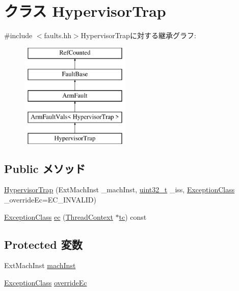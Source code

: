 \hypertarget{classArmISA_1_1HypervisorTrap}{
\section{クラス HypervisorTrap}
\label{classArmISA_1_1HypervisorTrap}
}


{\ttfamily \#include $<$faults.hh$>$}HypervisorTrapに対する継承グラフ:\begin{figure}[H]
\begin{center}
\leavevmode
\includegraphics[height=5cm]{classArmISA_1_1HypervisorTrap}
\end{center}
\end{figure}
\subsection*{Public メソッド}
\begin{DoxyCompactItemize}
\item 
\hyperlink{classArmISA_1_1HypervisorTrap_aed3e8c939479b9f3acffeafc9de7f777}{HypervisorTrap} (ExtMachInst \_\-machInst, \hyperlink{Type_8hh_a435d1572bf3f880d55459d9805097f62}{uint32\_\-t} \_\-iss, \hyperlink{namespaceArmISA_a04034d12009cf36227f4d2abff3331a2}{ExceptionClass} \_\-overrideEc=EC\_\-INVALID)
\item 
\hyperlink{namespaceArmISA_a04034d12009cf36227f4d2abff3331a2}{ExceptionClass} \hyperlink{classArmISA_1_1HypervisorTrap_aefab73b22a74d7c48b8a23230906d7cd}{ec} (\hyperlink{classThreadContext}{ThreadContext} $\ast$\hyperlink{namespaceArmISA_a5aff829af55e65b802d83dfcef4e9dd0}{tc}) const 
\end{DoxyCompactItemize}
\subsection*{Protected 変数}
\begin{DoxyCompactItemize}
\item 
ExtMachInst \hyperlink{classArmISA_1_1HypervisorTrap_a4a11fa8755d51be93a88861302a9378d}{machInst}
\item 
\hyperlink{namespaceArmISA_a04034d12009cf36227f4d2abff3331a2}{ExceptionClass} \hyperlink{classArmISA_1_1HypervisorTrap_af5e67d95019a0b5aba4c42205567eda7}{overrideEc}
\end{DoxyCompactItemize}


